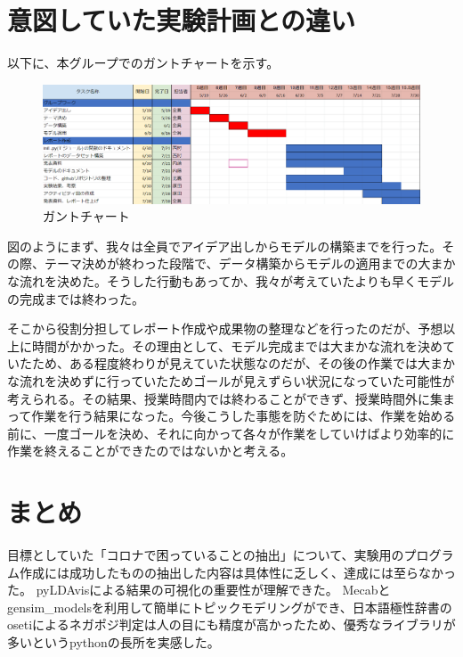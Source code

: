 \documentclass[a4paper, 11pt, titlepage]{jsarticle}
\begin{document}
\section{意図していた実験計画との違い}
以下に、本グループでのガントチャートを示す。\\
\begin{figure}[H]
  \centering
  \includegraphics[scale=0.45]{gantotya-to.png}
  \caption{ガントチャート}
\end{figure}
図のようにまず、我々は全員でアイデア出しからモデルの構築までを行った。その際、テーマ決めが終わった段階で、データ構築からモデルの適用までの大まかな流れを決めた。そうした行動もあってか、我々が考えていたよりも早くモデルの完成までは終わった。

そこから役割分担してレポート作成や成果物の整理などを行ったのだが、予想以上に時間がかかった。その理由として、モデル完成までは大まかな流れを決めていたため、ある程度終わりが見えていた状態なのだが、その後の作業では大まかな流れを決めずに行っていたためゴールが見えずらい状況になっていた可能性が考えられる。その結果、授業時間内では終わることができず、授業時間外に集まって作業を行う結果になった。今後こうした事態を防ぐためには、作業を始める前に、一度ゴールを決め、それに向かって各々が作業をしていけばより効率的に作業を終えることができたのではないかと考える。

\section{まとめ}
目標としていた「コロナで困っていることの抽出」について、実験用のプログラム作成には成功したものの抽出した内容は具体性に乏しく、達成には至らなかった。
pyLDAvisによる結果の可視化の重要性が理解できた。
Mecabとgensim\_modelsを利用して簡単にトピックモデリングができ、日本語極性辞書のosetiによるネガポジ判定は人の目にも精度が高かったため、優秀なライブラリが多いというpythonの長所を実感した。
\end{document}
